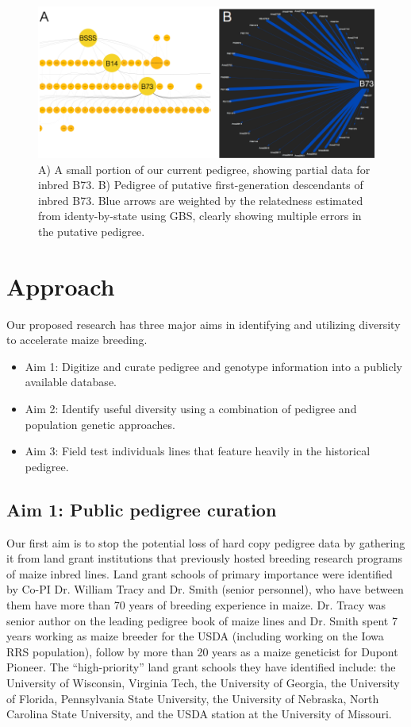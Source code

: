 \documentclass[12pt]{article}
\begin{document}
\begin{figure}
\includegraphics[width=1\linewidth]{crosby_combo}
\caption{A) A small portion of our current pedigree, showing partial data for inbred  B73. B) Pedigree of putative first-generation descendants of inbred B73. Blue arrows are weighted by the relatedness estimated from identy-by-state using GBS, clearly showing multiple errors in the putative pedigree.}
\label{fig:combo}
\end{figure}

\section*{Approach}
\label{sec:approach}
Our proposed research has three major aims in identifying and utilizing diversity to accelerate maize breeding.

\begin{itemize}
\item Aim 1: Digitize and curate pedigree and genotype information into a publicly available database. 
\item Aim 2: Identify useful diversity using a combination of pedigree and population genetic approaches.
\item Aim 3: Field test individuals lines that feature heavily in the historical pedigree.
\end{itemize}

\subsection*{Aim 1: Public pedigree curation}
Our first aim is to stop the potential loss of hard copy pedigree data by gathering it from land grant institutions that previously hosted breeding research programs of maize inbred lines. 
Land grant schools of primary importance were identified by Co-PI Dr. William Tracy and  Dr. Smith (senior personnel), who have between them have more than 70 years of breeding experience in maize. 
Dr. Tracy was senior author on the leading pedigree book of maize lines \cite{gerdes1993compilation} and Dr. Smith spent 7 years working as maize breeder for the USDA (including working on the Iowa RRS population), follow by more than 20 years as a maize geneticist for Dupont Pioneer. The ``high-priority'' land grant schools they have identified include: the University of Wisconsin, Virginia Tech, the University of Georgia, the University of Florida, Pennsylvania State University, the University of Nebraska, North Carolina State University, and the USDA station at the University of Missouri. 
\end{document}
